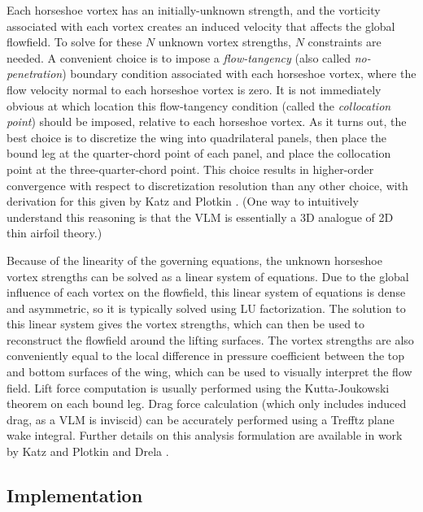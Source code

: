 Each horseshoe vortex has an initially-unknown strength, and the vorticity associated with each vortex creates an induced velocity that affects the global flowfield. To solve for these $N$ unknown vortex strengths, $N$ constraints are needed. A convenient choice is to impose a \emph{flow-tangency} (also called \emph{no-penetration}) boundary condition associated with each horseshoe vortex, where the flow velocity normal to each horseshoe vortex is zero. It is not immediately obvious at which location this flow-tangency condition (called the \emph{collocation point}) should be imposed, relative to each horseshoe vortex. As it turns out, the best choice is to discretize the wing into quadrilateral panels, then place the bound leg at the quarter-chord point of each panel, and place the collocation point at the three-quarter-chord point. This choice results in higher-order convergence with respect to discretization resolution than any other choice, with derivation for this given by Katz and Plotkin \cite{katz_lowspeed_2004}. (One way to intuitively understand this reasoning is that the VLM is essentially a 3D analogue of 2D thin airfoil theory.)

Because of the linearity of the governing equations, the unknown horseshoe vortex strengths can be solved as a linear system of equations. Due to the global influence of each vortex on the flowfield, this linear system of equations is dense and asymmetric, so it is typically solved using LU factorization. The solution to this linear system gives the vortex strengths, which can then be used to reconstruct the flowfield around the lifting surfaces. The vortex strengths are also conveniently equal to the local difference in pressure coefficient between the top and bottom surfaces of the wing, which can be used to visually interpret the flow field. Lift force computation is usually performed using the Kutta-Joukowski theorem on each bound leg. Drag force calculation (which only includes induced drag, as a VLM is inviscid) can be accurately performed using a Trefftz plane wake integral. Further details on this analysis formulation are available in work by Katz and Plotkin \cite{katz_lowspeed_2004} and Drela \cite{drela_flight_2013}.

\subsection{Implementation}

